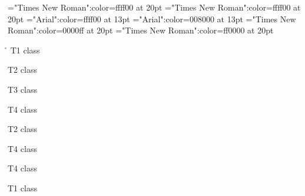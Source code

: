 \font\tdta="Times New Roman":color=ffff00 at 20pt
\font\tdtbta="Times New Roman":color=ffff00 at 20pt
\font\tdtctbta="Arial":color=ffff00 at 13pt
\font\tctbta="Arial":color=008000 at 13pt
\font\tbta="Times New Roman":color=0000ff at 20pt
\font\ta="Times New Roman":color=ff0000 at 20pt
 \r\n
\ta T1 class 

\tbta T2 class 

\tctbta T3 class 

\tdtctbta T4 class 

\tbta T2 class 

\tdtbta T4 class 

\tdta T4 class 

\ta T1 class 


\bye

